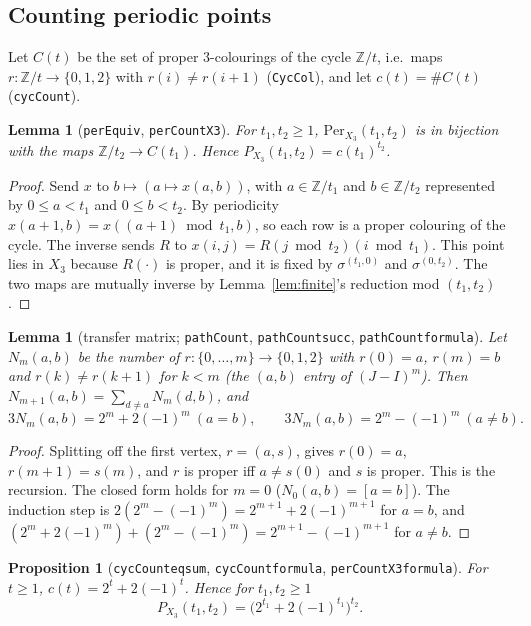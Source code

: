 \documentclass[11pt]{article}
\newtheorem{lemma}[theorem]{Lemma}
\newtheorem{proposition}[theorem]{Proposition}
\theoremstyle{definition}
\theoremstyle{remark}
\renewcommand{\_}{\oldus\allowbreak}
\newcommand{\Z}{\mathbb{Z}}
\newcommand{\Per}{\mathrm{Per}}
\newcommand{\lean}[1]{\texttt{#1}}
\begin{document}
\subsection{Counting periodic points}

Let $C(t)$ be the set of proper $3$-colourings of the cycle $\Z/t$, i.e.\ maps $r:\Z/t\to\{0,1,2\}$ with
$r(i)\neq r(i+1)$ (\lean{CycCol}), and let $c(t)=\#C(t)$ (\lean{cycCount}).

\begin{lemma}[\lean{perEquiv}, \lean{perCount\_X3}]
For $t_1,t_2\ge1$, $\Per_{X_3}(t_1,t_2)$ is in bijection with the maps $\Z/t_2\to C(t_1)$. Hence
$P_{X_3}(t_1,t_2)=c(t_1)^{t_2}$.
\end{lemma}

\begin{proof}
Send $x$ to $b\mapsto(a\mapsto x(a,b))$, with $a\in\Z/t_1$ and $b\in\Z/t_2$ represented by
$0\le a<t_1$ and $0\le b<t_2$. By periodicity $x(a+1,b)=x((a+1)\bmod t_1,b)$, so each row is a proper
colouring of the cycle. The inverse sends $R$ to $x(i,j)=R(j\bmod t_2)(i\bmod t_1)$. This point lies in
$X_3$ because $R(\cdot)$ is proper, and it is fixed by $\sigma^{(t_1,0)}$ and $\sigma^{(0,t_2)}$. The
two maps are mutually inverse by Lemma~\ref{lem:finite}'s reduction mod $(t_1,t_2)$.
\end{proof}

\begin{lemma}[transfer matrix; \lean{pathCount}, \lean{pathCount\_succ}, \lean{pathCount\_formula}]
Let $N_m(a,b)$ be the number of $r:\{0,\dots,m\}\to\{0,1,2\}$ with $r(0)=a$, $r(m)=b$ and
$r(k)\neq r(k+1)$ for $k<m$ (the $(a,b)$ entry of $(J-I)^m$). Then
$N_{m+1}(a,b)=\sum_{d\neq a}N_m(d,b)$, and
\[
  3N_m(a,b)=2^m+2(-1)^m\ (a=b),\qquad 3N_m(a,b)=2^m-(-1)^m\ (a\neq b).
\]
\end{lemma}

\begin{proof}
Splitting off the first vertex, $r=(a,s)$, gives $r(0)=a$, $r(m+1)=s(m)$, and $r$ is proper iff
$a\neq s(0)$ and $s$ is proper. This is the recursion. The closed form holds for $m=0$
($N_0(a,b)=[a=b]$). The induction step is $2(2^m-(-1)^m)=2^{m+1}+2(-1)^{m+1}$ for $a=b$, and
$(2^m+2(-1)^m)+(2^m-(-1)^m)=2^{m+1}-(-1)^{m+1}$ for $a\neq b$.
\end{proof}

\begin{proposition}[\lean{cycCount\_eq\_sum}, \lean{cycCount\_formula}, \lean{perCount\_X3\_formula}]
For $t\ge1$, $c(t)=2^t+2(-1)^t$. Hence for $t_1,t_2\ge1$
\[
  P_{X_3}(t_1,t_2)=\bigl(2^{t_1}+2(-1)^{t_1}\bigr)^{t_2}.
\]
\end{proposition}
\end{document}
